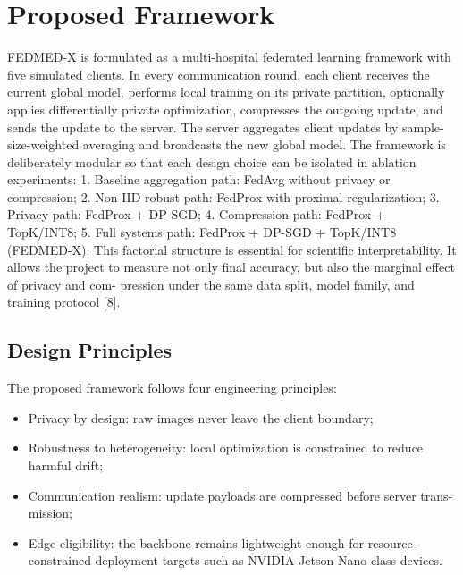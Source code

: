 \documentclass[12pt,a4paper]{report}
\begin{document}
\section{Proposed Framework}
FEDMED-X is formulated as a multi-hospital federated learning framework with five simulated clients. In every communication round, each client receives the current global model, performs local training on its private partition, optionally applies differentially private optimization, compresses the outgoing update, and sends the update to the server. The server aggregates client updates by sample-size-weighted averaging and broadcasts the new global model.
The framework is deliberately modular so that each design choice can be isolated in ablation experiments:
1. Baseline aggregation path: FedAvg without privacy or compression; 2. Non-IID robust path: FedProx with proximal regularization; 3. Privacy path: FedProx + DP-SGD; 4. Compression path: FedProx + TopK/INT8; 5. Full systems path: FedProx + DP-SGD + TopK/INT8 (FEDMED-X).
This factorial structure is essential for scientific interpretability. It allows the project to measure not only final accuracy, but also the marginal effect of privacy and com- pression under the same data split, model family, and training protocol [8].
\subsection{Design Principles}
The proposed framework follows four engineering principles:
\begin{itemize}
\item Privacy by design: raw images never leave the client boundary;
\item Robustness to heterogeneity: local optimization is constrained to reduce harmful drift;
\item Communication realism: update payloads are compressed before server trans- mission;
\item Edge eligibility: the backbone remains lightweight enough for resource-constrained deployment targets such as NVIDIA Jetson Nano class devices.
\end{itemize}
\end{document}
